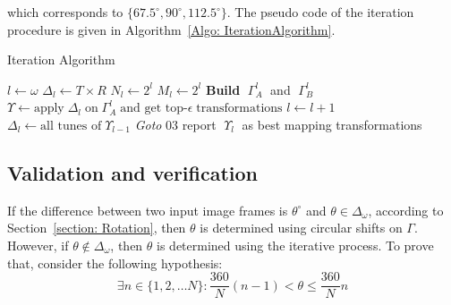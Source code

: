 \noindent
which corresponds to $\{67.5^\circ, 90^\circ, 112.5^\circ\}$. The pseudo code of the iteration procedure is given in Algorithm~\ref{Algo: IterationAlgorithm}.


\begin{algorithm}
	\caption{Iteration Algorithm}\label{Algo: IterationAlgorithm}
	\begin{algorithmic}[1]
		\State $l \gets \omega$
		\State $\Delta_l \gets T \times R$
		\State $N_l \gets 2^l$
		\State $M_l \gets 2^l$
		\State \textbf{Build} $\; \Gamma_A^l \;$ and $\; \Gamma_B^l \;$
		\State $\Upsilon \gets \text{apply} \; \Delta_l \; \text{on} \; \Gamma_A^l \; \text{and get top-}\epsilon \; \text{transformations}$
		\State $l \gets l+1$
		\State $\Delta_l \gets \text{all tunes of} \; \Upsilon_{l-1}$
		\State \textit{Goto} 03
		\Else
		\State report $\;\Upsilon_l\;$ as best mapping transformations
		\EndIf
		\EndProcedure
	\end{algorithmic}
\end{algorithm}



\subsection{Validation and verification} \label{section: Validation}
If the difference between two input image frames is $\theta^\circ$ and $\theta \in \Delta_\omega$, according to Section~\ref{section: Rotation}, then $\theta$ is determined using circular shifts on $\Gamma$. However, if $\theta \notin \Delta_\omega$, then $\theta$ is determined using the iterative process. To prove that, consider the following hypothesis:
\begin{equation}
\exists n \in \{1, 2, \dots N \} \colon \frac{360}{N}(n-1) < \theta \leq \frac{360}{N}n 
\end{equation}

